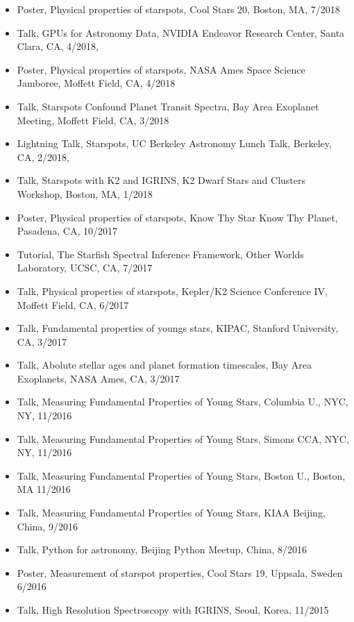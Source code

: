 \documentclass[10pt,letterpaper]{article}
\begin{document}
\begin{itemize}
    \item Poster, Physical properties of starspots, Cool Stars 20, Boston, MA, 7/2018
    \item Talk, \href{https://speakerdeck.com/gully/gpus-for-astronomy-data}{\faSpeakerDeck} GPUs for Astronomy Data, NVIDIA Endeavor Research Center, Santa Clara, CA, 4/2018,
    \item Poster, Physical properties of starspots, NASA Ames Space Science Jamboree, Moffett Field, CA, 4/2018
    \item Talk, Starspots Confound Planet Transit Spectra, Bay Area Exoplanet Meeting, Moffett Field, CA, 3/2018
    \item Lightning Talk, Starspots, UC Berkeley Astronomy Lunch Talk, Berkeley, CA, 2/2018,
    \item Talk, Starspots with K2 and IGRINS, K2 Dwarf Stars and Clusters Workshop, Boston, MA, 1/2018
    \item Poster, Physical properties of starspots, Know Thy Star Know Thy Planet, Pasadena, CA, 10/2017
    \item Tutorial, The Starfish Spectral Inference Framework, Other Worlds Laboratory, UCSC, CA, 7/2017
    \item Talk, Physical properties of starspots, Kepler/K2 Science Conference IV, Moffett Field, CA, 6/2017
    \item Talk, Fundamental properties of youngs stars, KIPAC, Stanford University, CA, 3/2017
    \item Talk, Abolute stellar ages and planet formation timescales, Bay Area Exoplanets, NASA Ames, CA, 3/2017
    \item Talk, \href{https://speakerdeck.com/gully/measuring-fundamental-properties-of-young-stars}{\faSpeakerDeck} Measuring Fundamental Properties of Young Stars, Columbia U., NYC, NY, 11/2016
    \item Talk, Measuring Fundamental Properties of Young Stars, Simons CCA, NYC, NY, 11/2016
    \item Talk, Measuring Fundamental Properties of Young Stars, Boston U., Boston, MA 11/2016
    \item Talk, Measuring Fundamental Properties of Young Stars, KIAA Beijing, China, 9/2016
    \item Talk, Python for astronomy, Beijing Python Meetup, China, 8/2016
    \item Poster, Measurement of starspot properties, Cool Stars 19, Uppsala, Sweden 6/2016
    \item Talk, High Resolution Spectroscopy with IGRINS, Seoul, Korea, 11/2015

\end{itemize}
\end{document}
